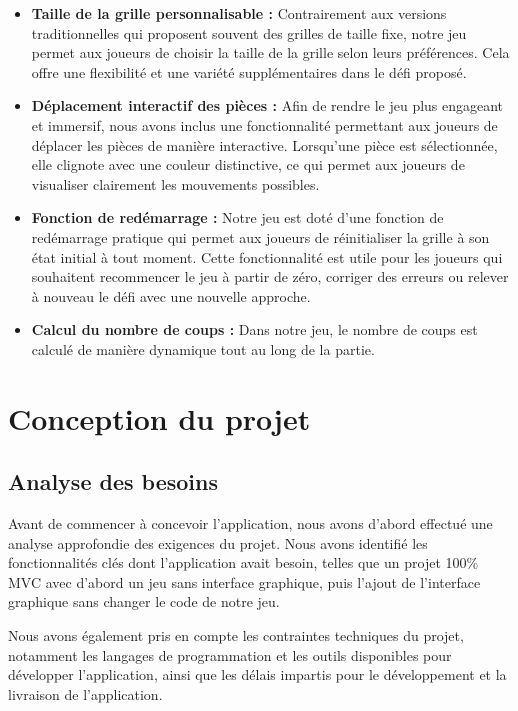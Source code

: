 \documentclass[a4paper,10pt]{article}
\begin{document}
\begin{itemize}
\item \textbf{Taille de la grille personnalisable :} Contrairement aux versions traditionnelles qui proposent souvent des grilles de taille fixe, notre jeu permet aux joueurs de choisir la taille de la grille selon leurs préférences. Cela offre une flexibilité et une variété supplémentaires dans le défi proposé.

\item \textbf{Déplacement interactif des pièces :} Afin de rendre le jeu plus engageant et immersif, nous avons inclus une fonctionnalité permettant aux joueurs de déplacer les pièces de manière interactive. Lorsqu'une pièce est sélectionnée, elle clignote avec une couleur distinctive, ce qui permet aux joueurs de visualiser clairement les mouvements possibles.

\item \textbf{Fonction de redémarrage :} Notre jeu est doté d'une fonction de redémarrage pratique qui permet aux joueurs de réinitialiser la grille à son état initial à tout moment. Cette fonctionnalité est utile pour les joueurs qui souhaitent recommencer le jeu à partir de zéro, corriger des erreurs ou relever à nouveau le défi avec une nouvelle approche.

\item \textbf{Calcul du nombre de coups :} Dans notre jeu, le nombre de coups est calculé de manière dynamique tout au long de la partie.
\end{itemize}

\section{Conception du projet}

\subsection{Analyse des besoins}
Avant de commencer à concevoir l'application, nous avons d'abord effectué une analyse approfondie des exigences du projet. Nous avons identifié les fonctionnalités clés dont l'application avait besoin, telles que un projet 100\% MVC avec d'abord un jeu sans interface graphique, puis l'ajout de l'interface graphique sans changer le code de notre jeu.

Nous avons également pris en compte les contraintes techniques du projet, notamment les langages de programmation et les outils disponibles pour développer l'application, ainsi que les délais impartis pour le développement et la livraison de l'application.
\end{document}
